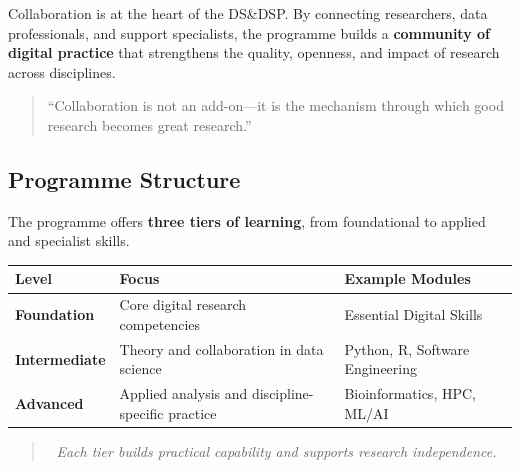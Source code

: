 \documentclass[
  letterpaper,
  DIV=11,
  numbers=noendperiod]{scrartcl}
\begin{document}
Collaboration is at the heart of the DS\&DSP. By connecting researchers,
data professionals, and support specialists, the programme builds a
\textbf{community of digital practice} that strengthens the quality,
openness, and impact of research across disciplines.

\begin{quote}
``Collaboration is not an add-on---it is the mechanism through which
good research becomes great research.''
\end{quote}

\subsection{Programme Structure}\label{programme-structure}

The programme offers \textbf{three tiers of learning}, from foundational
to applied and specialist skills.

\begin{longtable}[]{@{}
  >{\raggedright\arraybackslash}p{}
  >{\raggedright\arraybackslash}p{}
  >{\raggedright\arraybackslash}p{}@{}}
\toprule\noalign{}
\begin{minipage}[b]{\linewidth}\raggedright
\textbf{Level}
\end{minipage} & \begin{minipage}[b]{\linewidth}\raggedright
\textbf{Focus}
\end{minipage} & \begin{minipage}[b]{\linewidth}\raggedright
\textbf{Example Modules}
\end{minipage} \\
\midrule\noalign{}
\endhead
\bottomrule\noalign{}
\endlastfoot
\textbf{Foundation} & Core digital research competencies & Essential
Digital Skills \\
\textbf{Intermediate} & Theory and collaboration in data science &
Python, R, Software Engineering \\
\textbf{Advanced} & Applied analysis and discipline-specific practice &
Bioinformatics, HPC, ML/AI \\
\end{longtable}

\begin{quote}
🧩 \emph{Each tier builds practical capability and supports research
independence.}
\end{quote}
\end{document}
